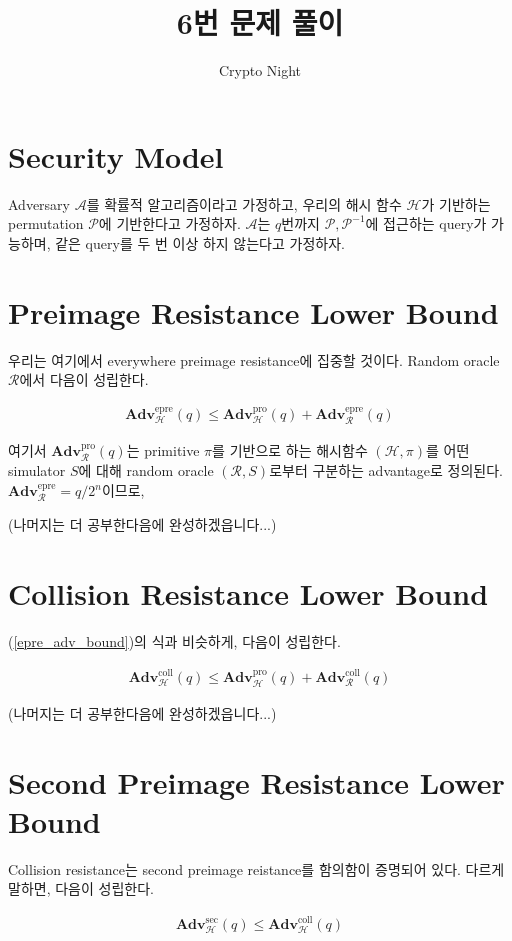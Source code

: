 \documentclass{article}
\title{6번 문제 풀이}
\author{Crypto Night}
\newcommand{\adv}{\mathbf{Adv}}
\begin{document}
  \maketitle

  \section{Security Model}
  Adversary \(\mathcal{A}\)를 확률적 알고리즘이라고 가정하고, 우리의 해시 함수 \(\mathcal{H}\)가 기반하는 permutation \(\mathcal{P}\)에 기반한다고 가정하자. \(\mathcal{A}\)는 \(q\)번까지 \(\mathcal{P}, \mathcal{P}^{-1}\)에 접근하는 query가 가능하며, 같은 query를 두 번 이상 하지 않는다고 가정하자.

  \section{Preimage Resistance Lower Bound}
  우리는 여기에서 everywhere preimage resistance에 집중할 것이다.\cite{rogaway_cryptographic_2004} Random oracle \(\mathcal{R}\)에서 다음이 성립한다.\cite{andreeva_security_2011}

  \begin{align}\label{epre_adv_bound}
    \adv^\text{epre}_\mathcal{H}(q) \leq \adv^\text{pro}_\mathcal{H}(q) + \adv^\text{epre}_\mathcal{R}(q)
  \end{align}

  여기서 \(\adv^\text{pro}_\mathcal{R}(q)\)는 primitive \(\pi\)를 기반으로 하는 해시함수 \((\mathcal{H}, \pi)\)를 어떤 simulator \(S\)에 대해 random oracle \((\mathcal{R}, S)\)로부터 구분하는 advantage로 정의된다. \(\adv^\text{epre}_\mathcal{R}=q/2^n\)이므로,

  (나머지는 더 공부한다음에 완성하겠읍니다...)

  \section{Collision Resistance Lower Bound}
  (\ref{epre_adv_bound})의 식과 비슷하게, 다음이 성립한다.

  \begin{align*}
    \adv^\text{coll}_\mathcal{H}(q) \leq \adv^\text{pro}_\mathcal{H}(q) + \adv^\text{coll}_\mathcal{R}(q)
  \end{align*}

  (나머지는 더 공부한다음에 완성하겠읍니다...)

  \section{Second Preimage Resistance Lower Bound}
  Collision resistance는 second preimage reistance를 함의함이 증명되어 있다.\cite{rogaway_cryptographic_2004} 다르게 말하면, 다음이 성립한다.

  \begin{align*}
    \adv^\text{sec}_\mathcal{H}(q) \leq \adv^\text{coll}_\mathcal{H}(q)
  \end{align*}

  \printbibliography
\end{document}
